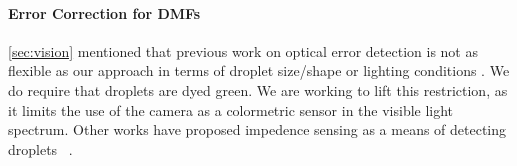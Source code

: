 \documentclass[sigconf, screen]{acmart}
\begin{document}



\paragraph{Error Correction for DMFs}

\autoref{sec:vision} mentioned that previous work on optical error detection is not as flexible as our approach in terms of droplet size/shape \cite{luo2013error} or lighting conditions \cite{shin2010vision, vo2017image-dmf}.
We do require that droplets are dyed green.
We are working to lift this restriction, as it limits the use of the camera as a colormetric sensor in the visible light spectrum.
Other works have proposed impedence sensing as a means of detecting droplets~ \cite{hadwen2012impedence}.
\end{document}

